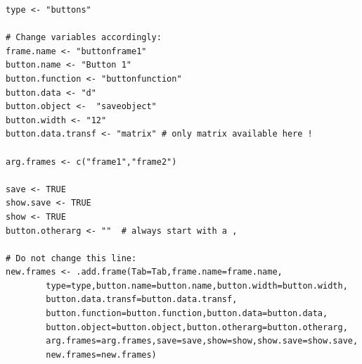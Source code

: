 \documentclass[a4paper]{article}\usepackage[]{graphicx}\usepackage[]{color}
\begin{document}
\begin{verbatim}
type <- "buttons"

# Change variables accordingly:
frame.name <- "buttonframe1"  
button.name <- "Button 1"  
button.function <- "buttonfunction" 
button.data <- "d" 
button.object <-  "saveobject" 
button.width <- "12"
button.data.transf <- "matrix" # only matrix available here !

arg.frames <- c("frame1","frame2")

save <- TRUE 
show.save <- TRUE
show <- TRUE
button.otherarg <- ""  # always start with a ,

# Do not change this line: 
new.frames <- .add.frame(Tab=Tab,frame.name=frame.name,
        type=type,button.name=button.name,button.width=button.width,
        button.data.transf=button.data.transf,
        button.function=button.function,button.data=button.data,
        button.object=button.object,button.otherarg=button.otherarg,
        arg.frames=arg.frames,save=save,show=show,show.save=show.save,
        new.frames=new.frames)

\end{verbatim}
\end{document}
